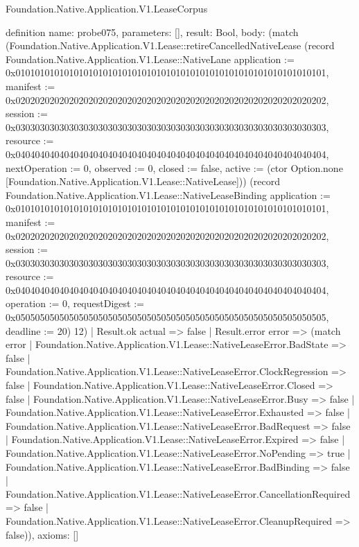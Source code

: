 \begin{lexlean}{Foundation.Native.Application.V1.LeaseCorpus}
\begin{semanticmodule}
definition{
  name: probe075,
  parameters: [],
  result: Bool,
  body: (match (Foundation.Native.Application.V1.Lease::retireCancelledNativeLease (record Foundation.Native.Application.V1.Lease::NativeLane {application := 0x0101010101010101010101010101010101010101010101010101010101010101, manifest := 0x0202020202020202020202020202020202020202020202020202020202020202, session := 0x0303030303030303030303030303030303030303030303030303030303030303, resource := 0x0404040404040404040404040404040404040404040404040404040404040404, nextOperation := 0, observed := 0, closed := false, active := (ctor Option.none [Foundation.Native.Application.V1.Lease::NativeLease])}) (record Foundation.Native.Application.V1.Lease::NativeLeaseBinding {application := 0x0101010101010101010101010101010101010101010101010101010101010101, manifest := 0x0202020202020202020202020202020202020202020202020202020202020202, session := 0x0303030303030303030303030303030303030303030303030303030303030303, resource := 0x0404040404040404040404040404040404040404040404040404040404040404, operation := 0, requestDigest := 0x0505050505050505050505050505050505050505050505050505050505050505, deadline := 20}) 12)
    | Result.ok actual => false
    | Result.error error => (match error
      | Foundation.Native.Application.V1.Lease::NativeLeaseError.BadState => false
      | Foundation.Native.Application.V1.Lease::NativeLeaseError.ClockRegression => false
      | Foundation.Native.Application.V1.Lease::NativeLeaseError.Closed => false
      | Foundation.Native.Application.V1.Lease::NativeLeaseError.Busy => false
      | Foundation.Native.Application.V1.Lease::NativeLeaseError.Exhausted => false
      | Foundation.Native.Application.V1.Lease::NativeLeaseError.BadRequest => false
      | Foundation.Native.Application.V1.Lease::NativeLeaseError.Expired => false
      | Foundation.Native.Application.V1.Lease::NativeLeaseError.NoPending => true
      | Foundation.Native.Application.V1.Lease::NativeLeaseError.BadBinding => false
      | Foundation.Native.Application.V1.Lease::NativeLeaseError.CancellationRequired => false
      | Foundation.Native.Application.V1.Lease::NativeLeaseError.CleanupRequired => false)),
  axioms: []
}


\end{semanticmodule}
\end{lexlean}

